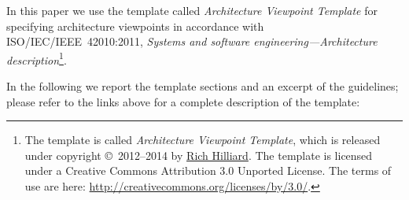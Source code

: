 


%

In this paper we use the template called \textit{Architecture Viewpoint Template} for specifying architecture viewpoints in
  accordance with ISO/IEC/IEEE~42010:2011, \textit{Systems and
    software engineering---Architecture description}\footnote{The template is called \textit{Architecture Viewpoint Template}, which is released under copyright \copyright\
2012--2014 by \href{http://www.iso-architecture.org/42010/templates/}%
{Rich Hilliard}. 
The template is licensed under a
Creative Commons Attribution 3.0 Unported License. The terms of use
are here: 
\url{http://creativecommons.org/licenses/by/3.0/}.}.   


%

%
In the following we report the template sections and an excerpt of the guidelines; please refer to the links above for a complete description of the template: 

